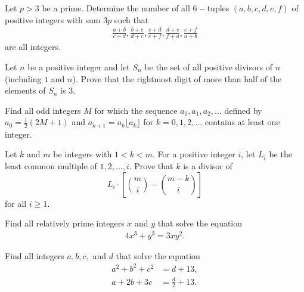 \documentclass[problems.tex]{subfile}
\begin{document}
	
	\begin{problem}
		Let $p>3$ be a prime. Determine the number of all $6-$tuples $(a,b,c,d,e,f)$ of positive integers with sum $3p$ such that
		\begin{align*}
			\frac{a+b}{c+d}, \frac{b+c}{d+e}, \frac{c+d}{e+f}, \frac{d+e}{f+a}, \frac{e+f}{a+b}
		\end{align*}
		are all integers.
	\end{problem}
	
	
	\begin{problem}
		Let $n$ be a positive integer and let $S_n$ be the set of all positive divisors of $n$ (including $1$ and $n$). Prove that the rightmost digit of more than half of the elements of $S_n$ is $3$.
	\end{problem}
	
	
	
	\begin{problem}
		Find all odd integers $M$ for which the sequence $a_0,a_1,a_2,\dots$ defined by $a_0=\frac{1}{2}(2M+1)$ and $a_{k+1} = a_k \lfloor a_k \rfloor$ for $k=0,1,2,\dots$ contains at least one integer.
	\end{problem}
	
	
	
	
	
	\begin{problem}
		Let $k$ and $m$ be integers with $1 < k < m$. For a positive integer $i$, let $L_i$ be the least common multiple of $1,2,\ldots,i$.
		Prove that $k$ is a divisor of $$L_i \cdot \left[\binom{m}{i} - \binom{m-k}{i}\right]$$ for all $i \geq 1$. %
	\end{problem}
	
	
	\begin{problem}
		Find all relatively prime integers $x$ and $y$ that solve the equation
		\begin{align*}
			4x^3 + y^3 = 3xy^2.
		\end{align*}
	\end{problem}
	
	
	\begin{problem}
		Find all integers $a,b,c,$ and $d$ that solve the equation
		\begin{align*}
			a^2 + b^2 + c^2 &= d + 13,\\
			a + 2b + 3c &= \frac{d}{2}+ 13.
		\end{align*}
	\end{problem}
	
\end{document}
